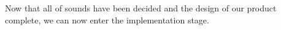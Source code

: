 Now that all of sounds have been decided and the design of our product complete, we can now enter the implementation stage. 




